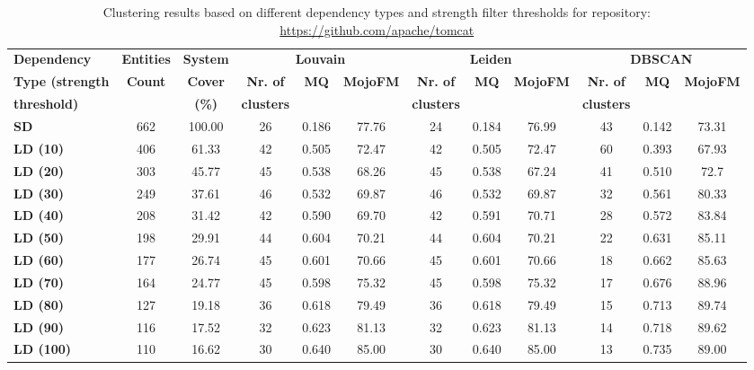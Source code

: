\documentclass{ieeeaccess}
\begin{document}
\begin{table}[htbp]
\centering
\caption{Clustering results based on different dependency types and strength filter thresholds for repository: \href{https://github.com/apache/tomcat}{https://github.com/apache/tomcat}}
\label{tab:clustering_results_tomcat}
\setlength{\tabcolsep}{7pt} 
\begin{tabular}{|l|c|c|ccc|ccc|ccc|}
\hline
 \textbf{Dependency} &  \textbf{Entities} & \textbf{System} & \multicolumn{3}{c|}{\textbf{Louvain}} & \multicolumn{3}{c|}{\textbf{Leiden}} & \multicolumn{3}{c|}{\textbf{DBSCAN}} \\
\cline{4-12}
\textbf{Type (strength } &  \textbf{Count} & \textbf{Cover} & \textbf{Nr. of } & \textbf{MQ} & \textbf{MojoFM} & \textbf{Nr. of} & \textbf{MQ} & \textbf{MojoFM} & \textbf{Nr. of} & \textbf{MQ} & \textbf{MojoFM}  \\
\textbf{threshold)} &  & \textbf{(\%)} & \textbf{clusters} & & & \textbf{clusters} & &  & \textbf{clusters} & &\\
\hline
\rowcolor[HTML]{ECECEC} \textbf{SD} & 662 & 100.00 & 26 & 0.186 & 77.76 & 24 & 0.184 & 76.99 & 43 & 0.142 & 73.31  \\
\textbf{LD (10)} & 406 & 61.33 & 42 & 0.505 & 72.47 & 42 & 0.505 & 72.47 & 60 & 0.393 & 67.93 \\
\textbf{LD (20)} & 303 & 45.77 & 45 & 0.538 & 68.26 & 45 & 0.538 & 67.24 & 41 & 0.510 & 72.7 \\
\textbf{LD (30)} & 249 & 37.61 & 46 & 0.532 & 69.87 & 46 & 0.532 & 69.87 & 32 & 0.561 & 80.33 \\
\textbf{LD (40)} & 208 & 31.42 & 42 & 0.590 & 69.70 & 42 & 0.591 & 70.71 & 28 & 0.572 & 83.84 \\
\textbf{LD (50)} & 198 & 29.91 & 44 & 0.604 & 70.21 & 44 & 0.604 & 70.21 & 22 & 0.631 & 85.11 \\
\textbf{LD (60)} & 177 & 26.74 & 45 & 0.601 & 70.66 & 45 & 0.601 & 70.66 & 18 & 0.662 & 85.63 \\
\textbf{LD (70)} & 164 & 24.77 & 45 & 0.598 & 75.32 & 45 & 0.598 & 75.32 & 17 & 0.676 & 88.96 \\
\textbf{LD (80)} & 127 & 19.18 & 36 & 0.618 & 79.49 & 36 & 0.618 & 79.49 & 15 & 0.713 & \cellcolor[HTML]{fef9e4}89.74 \\
\textbf{LD (90)} & 116 & 17.52 & 32 & 0.623 & 81.13 & 32 & 0.623 & 81.13 & 14 & 0.718 & 89.62 \\
\textbf{LD (100)} & 110 & 16.62 & 30 & \cellcolor[HTML]{fef9e4}0.640 & \cellcolor[HTML]{fef9e4}85.00 & 30 & \cellcolor[HTML]{fef9e4}0.640 & \cellcolor[HTML]{fef9e4}85.00 & 13 & \cellcolor[HTML]{fef9e4}0.735 & 89.00 \\

\end{tabular}
\end{table}
\end{document}
